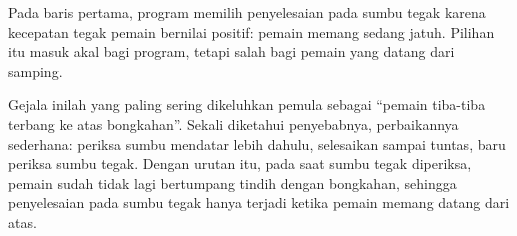 Pada baris pertama, program memilih penyelesaian pada sumbu
tegak karena kecepatan tegak pemain bernilai positif: pemain memang sedang
jatuh. Pilihan itu masuk akal bagi program, tetapi salah bagi pemain yang
datang dari samping.

Gejala inilah yang paling sering dikeluhkan pemula sebagai ``pemain tiba-tiba
terbang ke atas bongkahan''. Sekali diketahui penyebabnya, perbaikannya
sederhana: periksa sumbu mendatar lebih dahulu, selesaikan sampai tuntas, baru
periksa sumbu tegak. Dengan urutan itu, pada saat sumbu tegak diperiksa, pemain
sudah tidak lagi bertumpang tindih dengan bongkahan, sehingga penyelesaian pada
sumbu tegak hanya terjadi ketika pemain memang datang dari atas.
